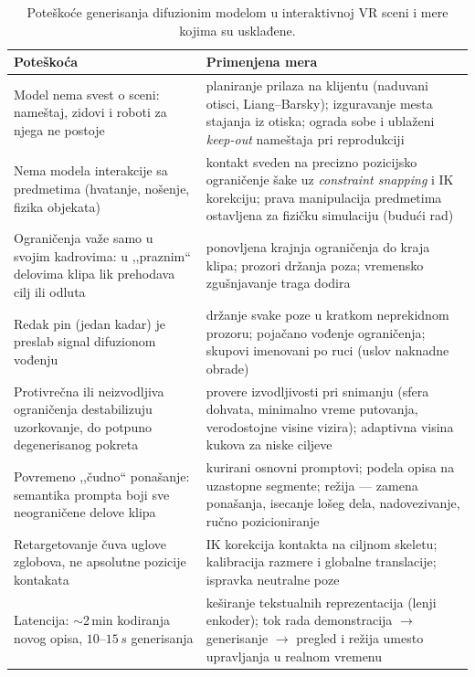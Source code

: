 \documentclass{article}
\begin{document}
\begin{table}[H]
\centering
\small
\begin{tabular}{p{} p{}}
\toprule
\textbf{Poteškoća} & \textbf{Primenjena mera} \\
\midrule
Model nema svest o sceni: nameštaj, zidovi i roboti za njega ne postoje &
planiranje prilaza na klijentu (naduvani otisci, Liang--Barsky); izguravanje mesta stajanja iz otiska; ograda sobe i ublaženi \textit{keep-out} nameštaja pri reprodukciji \\
\addlinespace
Nema modela interakcije sa predmetima (hvatanje, nošenje, fizika objekata) &
kontakt sveden na precizno pozicijsko ograničenje šake uz \textit{constraint snapping} i IK korekciju; prava manipulacija predmetima ostavljena za fizičku simulaciju (budući rad) \\
\addlinespace
Ograničenja važe samo u svojim kadrovima: u ,,praznim`` delovima klipa lik prehodava cilj ili odluta &
ponovljena krajnja ograničenja do kraja klipa; prozori držanja poza; vremensko zgušnjavanje traga dodira \\
\addlinespace
Redak pin (jedan kadar) je preslab signal difuzionom vođenju &
držanje svake poze u kratkom neprekidnom prozoru; pojačano vođenje ograničenja; skupovi imenovani po ruci (uslov naknadne obrade) \\
\addlinespace
Protivrečna ili neizvodljiva ograničenja destabilizuju uzorkovanje, do potpuno degenerisanog pokreta &
provere izvodljivosti pri snimanju (sfera dohvata, minimalno vreme putovanja, verodostojne visine vizira); adaptivna visina kukova za niske ciljeve \\
\addlinespace
Povremeno ,,čudno`` ponašanje: semantika prompta boji sve neograničene delove klipa &
kurirani osnovni promptovi; podela opisa na uzastopne segmente; režija --- zamena ponašanja, isecanje lošeg dela, nadovezivanje, ručno pozicioniranje \\
\addlinespace
Retargetovanje čuva uglove zglobova, ne apsolutne pozicije kontakata &
IK korekcija kontakta na ciljnom skeletu; kalibracija razmere i globalne translacije; ispravka neutralne poze \\
\addlinespace
Latencija: $\sim$2\,min kodiranja novog opisa, $10$--$15\,s$ generisanja &
keširanje tekstualnih reprezentacija (lenji enkoder); tok rada demonstracija $\to$ generisanje $\to$ pregled i režija umesto upravljanja u realnom vremenu \\
\bottomrule
\end{tabular}
\caption{Poteškoće generisanja difuzionim modelom u interaktivnoj VR sceni i mere kojima su usklađene.}
\label{tab:difficulties}
\end{table}
\end{document}
